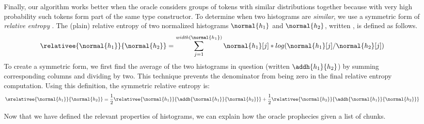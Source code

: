 Finally, our algorithm works better when the oracle considers groups
of tokens with similar distributions together because with very high
probability such tokens form part of the same type constructor. 
To determine when two histograms are {\em similar}, we use
a symmetric form of {\em relative entropy} \cite{Lin91:divergence}.
The (plain) relative entropy
of two normalized histograms $\normal{h_1}$ and $\normal{h_2}$, 
written , is
defined as follows.
\[
 \relativee{\normal{h_1}}{\normal{h_2}} 
   = \sum_{j=1}^{\mathit{width}(\normal{h_1})} \normal{h_1}[j]*log(\normal{h_1}[j]/\normal{h_2}[j])
\]
To create a symmetric form, we first find the average of the two
histograms in question (written $\addh{h_1}{h_2}$)
by summing corresponding columns and dividing by two.  This technique
prevents the denominator from being zero in the 
final relative entropy computation.  Using this definition, the symmetric
relative entropy is:
\[
 \srelativee{\normal{h_1}}{\normal{h_2}} 
   = \frac{1}{2}  \relativee{\normal{h_1}}{\addh{\normal{h_1}}{\normal{h_2}}}
   +  \frac{1}{2}  \relativee{\normal{h_2}}{\addh{\normal{h_1}}{\normal{h_2}}}
\]

Now that we have defined the relevant properties of histograms,
we can explain how the oracle prophecies given a list of chunks.

